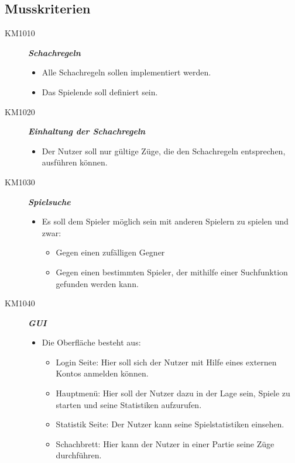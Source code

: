 \documentclass[parskip=full]{scrartcl}
\begin{document}
	\subsection{Musskriterien}
	\begin{description}
		\item[KM1010] \textbf{\textit{\gls{Schachregeln}}}
		\begin{itemize}
			\item Alle \gls{Schachregeln} sollen implementiert werden.
			\item Das Spielende soll definiert sein.	
		\end{itemize}
		\item[KM1020] \textbf{\textit{Einhaltung der \gls{Schachregeln}}}
		\begin{itemize}
			\item Der Nutzer soll nur gültige Züge, die den \gls{Schachregeln} entsprechen, ausführen können.
		\end{itemize}
		\item[KM1030] \textbf{\textit{Spielsuche}}
		\begin{itemize}
			\item Es soll dem Spieler möglich sein mit anderen Spielern zu spielen und zwar:
			\begin{itemize}
				\item Gegen einen zufälligen Gegner
				\item Gegen einen bestimmten Spieler, der mithilfe einer Suchfunktion gefunden werden kann.
			\end{itemize}
		\end{itemize}
		\item[KM1040] \textbf{\textit{\gls{GUI}}}
		\begin{itemize}
			\item Die Oberfläche besteht aus:
			\begin{itemize}		
				\item Login Seite: Hier soll sich der Nutzer mit Hilfe eines externen Kontos anmelden können.
				
				\item Hauptmenü: Hier soll der Nutzer dazu in der Lage sein, Spiele zu starten und seine Statistiken aufzurufen.
				
				\item Statistik Seite: Der Nutzer kann seine Spielstatistiken einsehen.
				
				\item Schachbrett: Hier kann der Nutzer in einer Partie seine Züge durchführen.
				

\end{itemize}
\end{itemize}
\end{description}
\end{document}
